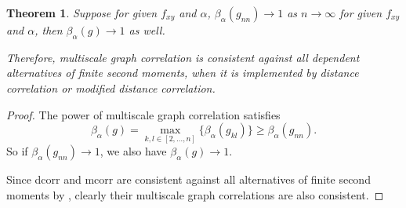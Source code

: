 \documentclass[11pt]{article}
\newtheorem{thm}{Theorem}
\begin{document}
\begin{thm}
Suppose for given $f_{xy}$ and $\alpha$, $\beta_{\alpha}(g_{nn}) \rightarrow 1$ as $n \rightarrow \infty$ for given $f_{xy}$ and $\alpha$, then $\beta_{\alpha}(g) \rightarrow 1$ as well.

Therefore, multiscale graph correlation is consistent against all dependent alternatives of finite second moments, when it is implemented by distance correlation or modified distance correlation.
\end{thm}
\begin{proof}
The power of multiscale graph correlation satisfies
\begin{equation}
\beta_{\alpha}(g)=\max_{k,l \in [2,\ldots,n]}\{\beta_{\alpha}(g_{kl})\} \geq \beta_{\alpha}(g_{nn}).
\end{equation}
So if $\beta_{\alpha}(g_{nn}) \rightarrow 1$, we also have $\beta_{\alpha}(g) \rightarrow 1$.

Since dcorr and mcorr are consistent against all alternatives of finite second moments by \cite{SzekelyRizzoBakirov2007, SzekelyRizzo2013a}, clearly their multiscale graph correlations are also consistent.
\end{proof}
\end{document}
